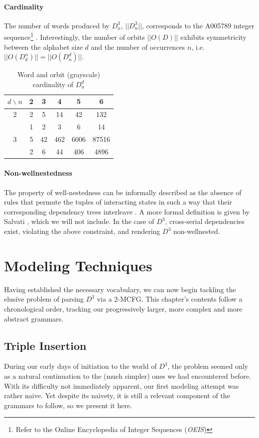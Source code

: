 \documentclass[nonatbib,numbers,10pt]{sigplanconf}
\begin{document}
\paragraph{Cardinality}
The number of words produced by $D^3_n$, $| \! | D^3_n | \! |$, corresponds to the A005789 integer sequence\footnote{Refer to the Online Encyclopedia of Integer Sequences (\textit{OEIS})} \cite{moortgat}.
Interestingly, the number of orbits $| \! | O(D) | \! |$ exhibits symmetricity between the alphabet size $d$ and the number of occurrences $n$, i.e. $| \! | O(D^n_d) | \! | = | \! | O(D^d_n) | \! |$.
\begin{table}[h!]
\begin{center}
\begin{tabular}{c | c c c c c }
$d \backslash n$ & 2 & 3 & 4 & 5 & 6\\
\hline
2 & 2 & 5 & 14 & 42 & 132\\
\rowcolor{Gray}
\ & 1 & 2 & 3 & 6 & 14\\
3 & 5 & 42 & 462 & 6006 & 87516\\
\rowcolor{Gray}
\ & 2 & 6 & 44 & 406 & 4896\\
\end{tabular}
\end{center}
\caption{Word and orbit (grayscale) cardinality of $D^d_n$}
\end{table}
\paragraph{Non-wellnestedness}
The property of well-nestedness can be informally described as the absence of rules that permute the tuples of interacting states in such a way that their corresponding dependency trees interleave \cite{joshi}. A more formal definition is given by Salvati \cite{salvati}, which we will not include. In the case of $D^3$, cross-serial dependencies exist, violating the above constraint, and rendering $D^3$ non-wellnested.

\section{Modeling Techniques}\label{sec2}
Having established the necessary vocabulary, we can now begin tackling the elusive problem of parsing $D^3$ via a 2-MCFG. This chapter's contents follow a chronological order, tracking our progressively larger, more complex and more abstract grammars.
\subsection{Triple Insertion}
During our early days of initiation to the world of $D^3$, the problem seemed only as a natural continuation to the (much simpler) ones we had encountered before. With its difficulty not immediately apparent, our first modeling attempt was rather naive. Yet despite its naivety, it is still a relevant component of the grammars to follow, so we present it here.
\end{document}
